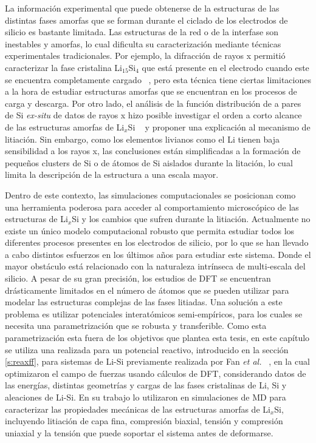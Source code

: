 La información experimental que puede obtenerse de la estructuras de las 
distintas fases amorfas que se forman durante el ciclado de los electrodos de 
silicio es bastante limitada. Las estructuras de la red o de la interfase son 
inestables y amorfas, lo cual dificulta su caracterización mediante técnicas
experimentales tradicionales. Por ejemplo, la difracción de rayos x permitió
caracterizar la fase cristalina Li$_{15}$Si$_4$ que está presente en el electrodo
cuando este se encuentra completamente cargado ~\cite{obrovac2004}, pero esta 
técnica tiene ciertas limitaciones a la hora de estudiar estructuras amorfas 
que se encuentran en los procesos de carga y descarga. Por otro lado, el análisis
de la función distribución de a pares de Si \textit{ex-situ} de datos de rayos x
hizo posible investigar el orden a corto alcance de las estructuras amorfas de
Li$_x$Si ~\cite{key2011} y proponer una explicación al mecanismo de litiación.
Sin embargo, como los elementos livianos como el Li tienen baja sensibilidad a 
los rayos x, las conclusiones están simplificadas a la formación de pequeños 
clusters de Si o de átomos de Si aislados durante la litación, lo cual limita la 
descripción de la estructura a una escala mayor.

Dentro de este contexto, las simulaciones computacionales se posicionan como una
herramienta poderosa para acceder al comportamiento microscópico de las 
estructuras de Li$_x$Si y los cambios que sufren durante la litiación. Actualmente
no existe un único modelo computacional robusto que permita estudiar todos los
diferentes procesos presentes en los electrodos de silicio, por lo que se han 
llevado a cabo distintos esfuerzos en los últimos años para estudiar este sistema.
Donde el mayor obstáculo está relacionado con la naturaleza intrínseca de 
multi-escala del silicio. A pesar de su gran precisión, los estudios de DFT se
encuentran drásticamente limitados en el número de átomos que se pueden utilizar
para modelar las estructuras complejas de las fases litiadas. Una solución a este
problema es utilizar potenciales interatómicos semi-empíricos, para los cuales 
se necesita una parametrización que se robusta y transferible. Como esta 
parametrización esta fuera de los objetivos que plantea esta tesis, en este 
capítulo se utiliza una realizada para un potencial reactivo, introducido en 
la sección \ref{s:reaxff}, para sistemas de Li-Si previamente realizada por Fan 
\textit{et al.} ~\cite{fan2013}, en la cual optimizaron el campo de fuerzas usando 
cálculos de DFT, considerando datos de las energías, distintas geometrías y cargas
de las fases cristalinas de Li, Si y aleaciones de Li-Si. En su trabajo lo 
utilizaron en simulaciones de MD para caracterizar las propiedades mecánicas de
las estructuras amorfas de Li$_x$Si, incluyendo litiación de capa fina, compresión
biaxial, tensión y compresión uniaxial y la tensión que puede soportar el sistema 
antes de deformarse.


